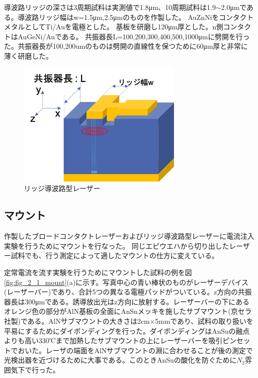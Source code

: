 導波路リッジの深さは3周期試料は実測値で1.8\si{\micro\metre}、10周期試料は1.9$\sim$2.0\si{\micro\metre}である。導波路リッジ幅はw=1.5\si{\micro\metre},2.5\si{\micro\metre}のものを作製した。
AuZnNiをコンタクトメタルとしてTi/Auを電極とした。
基板を研磨し120\si{\micro\metre}厚とした。n側コンタクトはAuGeNi/Auである。
共振器長L=100,200,300,400,500,1000\si{\micro\metre}に劈開を行った。共振器長が100,200umのものは劈開の直線性を保つために60\si{\micro\metre}厚と非常に薄く研磨した。
\begin{figure}[h]
	\centering
	\includegraphics[width=8cm]{figure/fig_2_1_ridge.png}
	\caption{リッジ導波路型レーザー}
	\label{fig_2_1_ridge}
\end{figure}

\subsection{マウント}%
作製したブロードコンタクトレーザーおよびリッジ導波路型レーザーに電流注入実験を行うためにマウントを行なった。
同じエピウエハから切り出したレーザー試料でも、行う測定によって適したマウントの仕方に変えている。


定常電流を流す実験を行うためにマウントした試料の例を図\ref{fig:fig_2_1_mount}(a)に示す。写真中心の青い棒状のものがレーザーデバイス(レーザーバー)であり、合計5つの異なる電極パッドがついている。z方向の共振器長は300\si{\micro\metre}である。誘導放出光はz方向に放射する。レーザーバーの下にあるオレンジ色の部分がAlN基板の全面にAnSnメッキを施したサブマウント(京セラ社製)である。AlNサブマウントの大きさは2cm×5mmであり、試料の取り扱いを平易にするためにダイボンディングを行った。ダイボンディングはAnSuの融点よりも高い330℃まで加熱したサブマウントの上にレーザーバーを吸引ピンセットでおいた。レーザの端面をAlNサブマウントの淵に合わせることが後の測定で光検出器を近づけるために大事である。このときAnSuの酸化を防ぐために$N_{2}$雰囲気下で行った。


